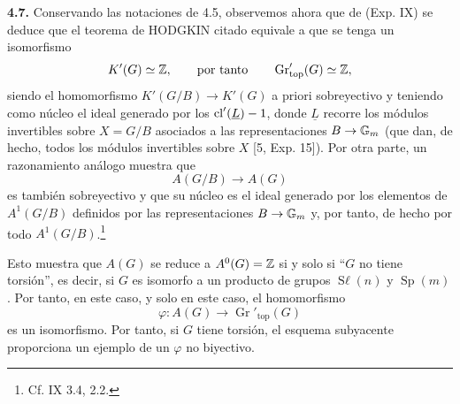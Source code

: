 \textbf{4.7.} Conservando las notaciones de 4.5, observemos ahora que de (Exp.
IX) se deduce que el teorema de HODGKIN citado equivale a que se tenga un
isomorfismo
\[
 K'(G)\simeq\Z,\qquad\text{por tanto}\qquad \operatorname{Gr}'_{\mathrm{top}}(G)\simeq\Z,
\]
siendo el homomorfismo $K'(G/B)\to K'(G)$ a priori sobreyectivo y teniendo
como núcleo el ideal generado por los $\cl'(\underline L)-1$, donde
$\underline L$ recorre los módulos invertibles sobre $X=G/B$ asociados a las
representaciones $B\to\Gm$ (que dan, de hecho, todos los módulos invertibles
sobre $X$ [5, Exp. 15]). Por otra parte, un razonamiento análogo muestra que
\[
 A(G/B)\longrightarrow A(G)
\]
es también sobreyectivo y que su núcleo es el ideal generado por los elementos
de $A^1(G/B)$ definidos por las representaciones $B\to\Gm$ y, por tanto, de
hecho por todo $A^1(G/B)$.\begingroup\renewcommand{\thefootnote}{*}\footnote{Cf.
IX 3.4, 2.2.}\addtocounter{footnote}{-1}\endgroup Esto muestra que $A(G)$ se
reduce a $A^0(\sisi{X}{G})=\Z$ si y solo si ``$G$ no tiene torsión'', es decir, si $G$ %
es isomorfo a un producto de grupos $\operatorname{S\ell}(n)$ y
$\operatorname{Sp}(m)$. Por tanto, en este caso, y solo en este caso, el
homomorfismo
\[
 \varphi:A(G)\longrightarrow\operatorname{Gr}'_{\mathrm{top}}(G)
\]
es un isomorfismo. Por tanto, si $G$ tiene torsión, el esquema subyacente
proporciona un ejemplo de un $\varphi$ no biyectivo.

